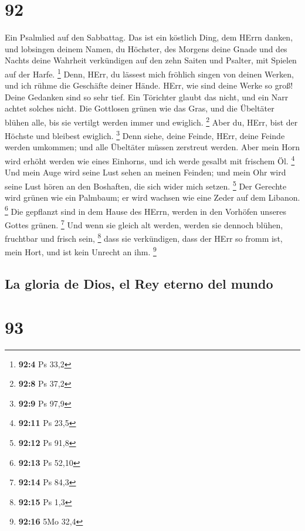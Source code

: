 \hypertarget{section-91}{%
\section{92}\label{section-91}}

 Ein Psalmlied auf den Sabbattag.  Das ist
ein köstlich Ding, dem HErrn danken, und lobsingen deinem Namen, du
Höchster,  des Morgens deine Gnade und des Nachts deine
Wahrheit verkündigen  auf den zehn Saiten und Psalter, mit
Spielen auf der Harfe. \footnote{\textbf{92:4} Ps 33,2} 
Denn, HErr, du lässest mich fröhlich singen von deinen Werken, und ich
rühme die Geschäfte deiner Hände.  HErr, wie sind deine
Werke so groß! Deine Gedanken sind so sehr tief.  Ein
Törichter glaubt das nicht, und ein Narr achtet solches nicht.
 Die Gottlosen grünen wie das Gras, und die Übeltäter
blühen alle, bis sie vertilgt werden immer und ewiglich. \footnote{\textbf{92:8}
  Ps 37,2}  Aber du, HErr, bist der Höchste und bleibest
ewiglich. \footnote{\textbf{92:9} Ps 97,9}  Denn siehe,
deine Feinde, HErr, deine Feinde werden umkommen; und alle Übeltäter
müssen zerstreut werden.  Aber mein Horn wird erhöht
werden wie eines Einhorns, und ich werde gesalbt mit frischem Öl.
\footnote{\textbf{92:11} Ps 23,5}  Und mein Auge wird
seine Lust sehen an meinen Feinden; und mein Ohr wird seine Lust hören
an den Boshaften, die sich wider mich setzen. \footnote{\textbf{92:12}
  Ps 91,8}  Der Gerechte wird grünen wie ein Palmbaum; er
wird wachsen wie eine Zeder auf dem Libanon. \footnote{\textbf{92:13} Ps
  52,10}  Die gepflanzt sind in dem Hause des HErrn,
werden in den Vorhöfen unseres Gottes grünen. \footnote{\textbf{92:14}
  Ps 84,3}  Und wenn sie gleich alt werden, werden sie
dennoch blühen, fruchtbar und frisch sein, \footnote{\textbf{92:15} Ps
  1,3}  dass sie verkündigen, dass der HErr so fromm ist,
mein Hort, und ist kein Unrecht an ihm. \footnote{\textbf{92:16} 5Mo
  32,4}

\hypertarget{la-gloria-de-dios-el-rey-eterno-del-mundo}{%
\subsection{La gloria de Dios, el Rey eterno del
mundo}\label{la-gloria-de-dios-el-rey-eterno-del-mundo}}

\hypertarget{section-92}{%
\section{93}\label{section-92}}

